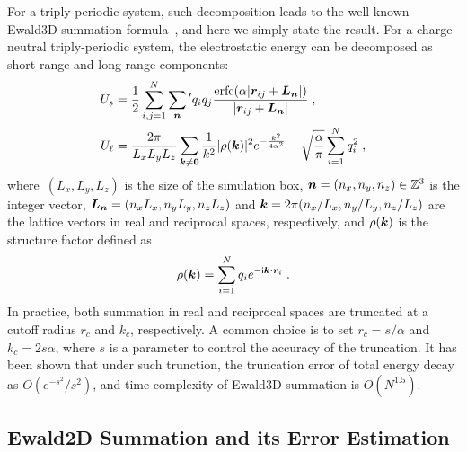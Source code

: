For a triply-periodic system, such decomposition leads to the well-known Ewald3D summation formula~\cite{Ewald1921AnnPhys}, and here we simply state the result.
For a charge neutral triply-periodic system, the electrostatic energy can be decomposed as short-range and long-range components:
\begin{align}
	U_{s} & = \frac{1}{2} \sum_{i, j=1}^N \sum_{\boldsymbol{n}}{}^\prime q_iq_j\frac{\mathrm{erfc}(\alpha\lvert\boldsymbol{r}_{ij}+\boldsymbol{L}_{\bm{n}} \rvert)}{\lvert\boldsymbol{r}_{ij}+ \boldsymbol{L}_{\bm{n}}\rvert} \;, \\
	U_{\ell} & = \frac{2 \pi}{L_x L_y L_z} \sum_{\boldsymbol{k} \neq \boldsymbol{0}} \frac{1}{k^2} \lvert\rho(\boldsymbol{k})\rvert^2 e^{-\frac{k^2}{4\alpha^2}} - \sqrt{\frac{\alpha}{\pi}}\sum_{i=1}^{N}q_i^2\;,
\end{align}
where~$(L_x, L_y, L_z)$ is the size of the simulation box, $\boldsymbol{n} = (n_x, n_y, n_z) \in \mathbb{Z}^3$ is the integer vector, $\boldsymbol{L}_{\boldsymbol{n}} = (n_x L_x, n_y L_y, n_z L_z)$ and $\boldsymbol{k} = 2\pi (n_x /L_x, n_y /L_y, n_z /L_z)$ are the lattice vectors in real and reciprocal spaces, respectively, and $\rho(\boldsymbol{k})$ is the structure factor defined as
\begin{equation}
	\rho(\boldsymbol{k}) = \sum_{i=1}^{N} q_i e^{-\mathsf i \boldsymbol{k}\cdot \boldsymbol{r}_i}\;.
\end{equation}
In practice, both summation in real and reciprocal spaces are truncated at a cutoff radius $r_c$ and $k_{c}$, respectively.
A common choice is to set $r_c = s / \alpha$ and $k_c = 2 s \alpha$, where $s$ is a parameter to control the accuracy of the truncation.
It has been shown that under such trunction, the truncation error of total energy decay as $O(e^{-s^2} / s^{2})$, and time complexity of Ewald3D summation is $O(N^{1.5})$.


\subsection{Ewald2D Summation and its Error Estimation}

